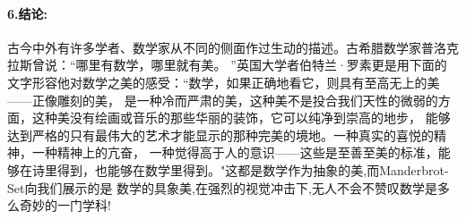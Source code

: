 \documentclass{article}
\begin{document}
    \paragraph{6.结论:}
    古今中外有许多学者、数学家从不同的侧面作过生动的描述。古希腊数学家普洛克拉斯曾说：“哪里有数学，哪里就有美。
    ”英国大学者伯特兰·罗素更是用下面的文字形容他对数学之美的感受：“数学，如果正确地看它，则具有至高无上的美——正像雕刻的美，
    是一种冷而严肃的美，这种美不是投合我们天性的微弱的方面，这种美没有绘画或音乐的那些华丽的装饰，它可以纯净到崇高的地步，
    能够达到严格的只有最伟大的艺术才能显示的那种完美的境地。一种真实的喜悦的精神，一种精神上的亢奋，
    一种觉得高于人的意识——这些是至善至美的标准，能够在诗里得到，也能够在数学里得到。"这都是数学作为抽象的美,而Manderbrot-Set向我们展示的是
    数学的具象美,在强烈的视觉冲击下,无人不会不赞叹数学是多么奇妙的一门学科!
    \cite{Mandelbrot-Set-Summary}



\end{document}
